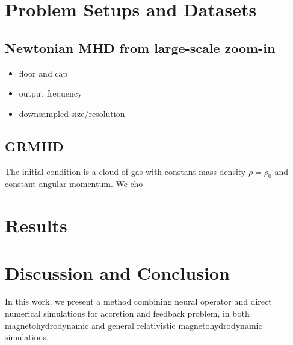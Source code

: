 \documentclass{article}
\newcommand{\hyw}[1]{{\color{red}{[{#1}]}}}
\newcommand{\hywcom}[1]{{\color{purple}{[HYW: #1]}}}
\begin{document}
\section{Problem Setups and Datasets}
\label{sec:setup}

\subsection{Newtonian MHD from large-scale zoom-in}

\begin{itemize}
    \item floor and cap
    \item output frequency
    \item downsampled size/resolution
\end{itemize}

\subsection{GRMHD}
The initial condition is a cloud of gas with constant mass density $\rho=\rho_0$ and constant angular momentum. We cho






\section{Results}
\label{sec:results}



\section{Discussion and Conclusion}
\label{sec:conclusion}

\hywcom{Conclusions.}
In this work, we present a method combining neural operator and direct numerical simulations for accretion and feedback problem, in both magnetohydrodynamic and general relativistic magnetohydrodynamic simulations.
\end{document}
